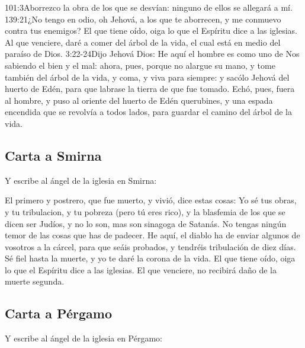 			{101:3}{Aborrezco la obra de los que se desvían: ninguno de ellos se allegará a mí.}%
			{139:21}{¿No tengo en odio, oh Jehová, a los que te aborrecen, y me conmuevo contra tus enemigos?} %
El que tiene oído, oiga lo que el Espíritu dice a las iglesias. Al que venciere, daré a comer del árbol de la vida, el cual está en medio del paraíso de Dios.%
				{3:22-24}{Dijo Jehová Dios: He aquí el hombre es como uno de Nos sabiendo el bien y el mal: ahora, pues, porque no alargue su mano, y tome también del árbol de la vida, y coma, y viva para siempre: y sacólo Jehová del huerto de Edén, para que labrase la tierra de que fue tomado. Echó, pues, fuera al hombre, y puso al oriente del huerto de Edén querubines, y una espada encendida que se revolvía a todos lados, para guardar el camino del árbol de la vida.}
\subsection*{Carta a Smirna}
Y escribe al ángel de la iglesia en Smirna:

El primero y postrero, que fue muerto, y vivió, dice estas cosas: %
Yo sé tus obras, y tu tribulacion, y tu pobreza (pero tú eres rico), y la blasfemia de los que se dicen ser Judíos, y no lo son, mas son sinagoga de Satanás. %
No tengas ningún temor de las cosas que has de padecer. He aquí, el diablo ha de enviar algunos de vosotros a la cárcel, para que seáis probados, y tendréis tribulación de diez días.%
 Sé fiel hasta la muerte, y yo te daré la corona de la vida. %
El que tiene oído, oiga lo que el Espíritu dice a las iglesias. El que venciere, no recibirá daño de la muerte segunda.
\subsection*{Carta a Pérgamo}
Y escribe al ángel de la iglesia en Pérgamo:

